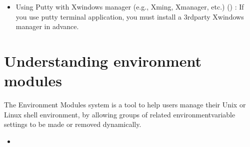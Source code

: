 \documentclass[a4paper,10pt,english]{sphinxmanual}
\begin{document}
\begin{itemize}
\item {} 
\sphinxAtStartPar
Using Putty with Xwindows manager (e.g., Xming, Xmanager, etc.) () :
If you use putty terminal application, you must install a 3rd\sphinxhyphen{}party Xwindows manager in advance.

\end{itemize}




\section{Understanding environment modules}
\label{\detokenize{guide:understanding-environment-modules}}\label{\detokenize{guide:module-details}}
\sphinxAtStartPar
The Environment Modules system is a tool to help users manage their Unix or Linux shell environment, by allowing groups of related environment\sphinxhyphen{}variable settings to be made or removed dynamically.
\begin{itemize}
\item {} 
\sphinxAtStartPar
{}

\end{itemize}
\end{document}
